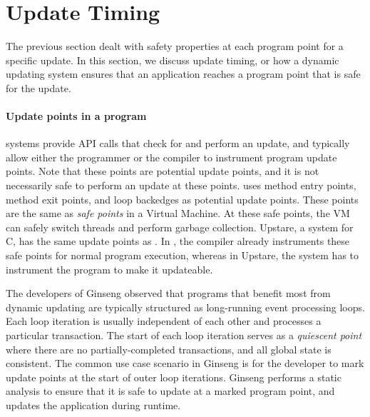 
\section{Update Timing}
The previous section dealt with safety properties at each program point for
a specific update.  In this section, we discuss update timing, or how a
dynamic updating system ensures that an application reaches a program point
that is safe for the update.

\paragraph{Update points in a program}
\USD systems provide API calls that check for and perform an update, and
typically allow either the programmer or the compiler to instrument program
update points. Note that these points are potential update points, and it is
not necessarily safe to perform an update at these points.  \JV uses method
entry points, method exit points, and loop backedges as potential update points.
These points are the same as {\em safe points} in a Virtual Machine. At
these safe points, the VM can safely switch threads and perform garbage
collection. Upstare, a \USD system
for C, has the same update points as \JV. In \JV, the compiler already
instruments these safe points for normal program execution, whereas in
Upstare, the \USD system has to instrument the program to make it
updateable.

The developers of Ginseng observed that programs that benefit most from
dynamic updating are typically structured as long-running event processing
loops. Each loop iteration is usually independent of each other and
processes a particular transaction. The start of each loop iteration serves
as a {\em quiescent point} where there are no partially-completed
transactions, and all global state is consistent. The common use case
scenario in Ginseng is for the developer to mark update points at the start
of outer loop iterations. Ginseng performs a static analysis to ensure that
it is safe to update at a marked program point, and updates the application
during runtime.

